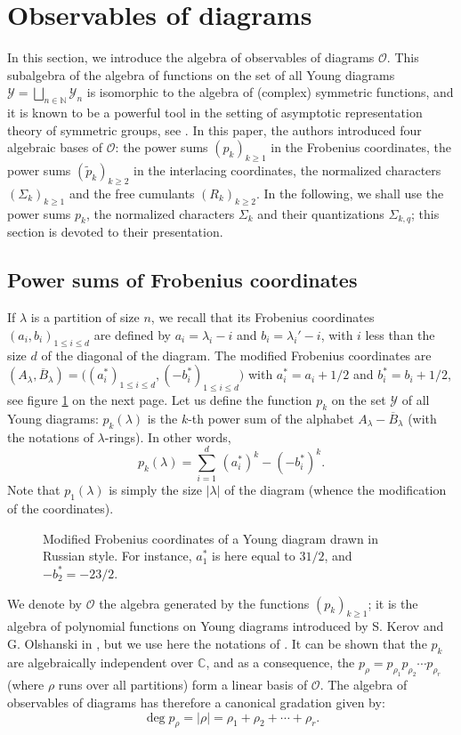 \documentclass[10pt]{amsart}
\theoremstyle{remark}
\newcommand{\N}{\mathbb{N}}
\newcommand{\C}{\mathbb{C}}
\newcommand{\young}{\mathscr{Y}}
\newcommand{\obs}{\mathscr{O}}
\newcommand{\tilp}{\widetilde{p}}
\newcommand{\figcap}[2]{\begin{figure}[ht] \begin{center} {\footnotesize{#1}} \caption{#2} \end{center} \end{figure}}
\begin{document}
\section{Observables of diagrams}\label{sect:observables}

In this section, we introduce the algebra of observables of diagrams $\obs$. This subalgebra of the algebra of functions on the set of all Young diagrams $\young=\bigsqcup_{n \in \N} \young_n$ is isomorphic to the algebra of (complex) symmetric functions, and it is known to be a powerful tool in the setting of asymptotic representation theory of symmetric groups, see \cite{IO02}. In this paper, the authors introduced four algebraic bases of $\obs$: the power sums $(p_k)_{k\geq 1}$ in the Frobenius coordinates, the power sums $(\tilp_k)_{k \geq 2}$ in the interlacing coordinates, the normalized characters $(\varSigma_k)_{k \geq 1}$ and the free cumulants $(R_k)_{k \geq 2}$. In the following, we shall use the power sums $p_k$, the normalized characters $\varSigma_k$ and their quantizations $\varSigma_{k,q}$; this section is devoted to their presentation.\bigskip


\subsection{Power sums of Frobenius coordinates}
If $\lambda$ is a partition of size $n$, we recall that its Frobenius coordinates $(a_i,b_i)_{1 \leq i \leq d}$ are defined by $a_i=\lambda_i-i$ and $b_i={\lambda_i}'-i$, with $i$ less than the size $d$ of the diagonal of the diagram. The modified Frobenius coordinates are $(A_\lambda,\overline{B}_\lambda)=\big((a_i^*)_{1 \leq i \leq d},(-b_i^*)_{1 \leq i \leq d}\big)$ with $a_i^*=a_i+1/2$ and $b_i^*=b_i+1/2$, see figure \ref{killinginthename} on the next page. Let us define the function $p_k$ on the set $\young$ of all Young diagrams: $p_k(\lambda)$ is the $k$-th power sum of the alphabet $A_\lambda-\overline{B}_\lambda$ (with the notations of $\lambda$-rings). In other words,
$$p_k(\lambda)=\sum_{i=1}^d \,(a_i^*)^k - (-b_i^*)^k.$$
Note that $p_1(\lambda)$ is simply the size $|\lambda|$ of the diagram (whence the modification of the coordinates).


\figcap{}{Modified Frobenius coordinates of a Young diagram drawn in Russian style. For instance, $a_1^*$ is here equal to $31/2$, and $-b_2^*=-23/2$.\label{killinginthename}}\bigskip


We denote by $\obs$ the algebra generated by the functions $(p_k)_{k \geq 1}$; it is the algebra of polynomial functions on Young diagrams introduced by S. Kerov and G. Olshanski in \cite{KO94}, but we use here the notations of \cite{IO02}. It can be shown that the $p_k$ are algebraically independent over $\C$, and as a consequence, the $p_\rho = p_{\rho_1} p_{\rho_2}\cdots p_{\rho_r}$ (where $\rho$ runs over all partitions) form a linear basis of $\obs$. The algebra of observables of diagrams has therefore a canonical grada\-tion given by:
$$\deg p_\rho=|\rho|=\rho_1+\rho_2+\cdots+\rho_r.$$
\medskip
\end{document}
